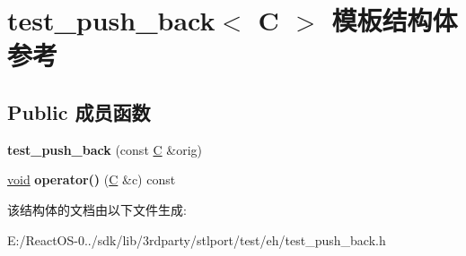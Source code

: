 \hypertarget{structtest__push__back}{}\section{test\+\_\+push\+\_\+back$<$ C $>$ 模板结构体 参考}
\label{structtest__push__back}
\subsection*{Public 成员函数}
\begin{DoxyCompactItemize}
\item 
\mbox{\label{structtest__push__back_a39711cd5eac0f96d58b5043b9ed240f3}} 
{\bfseries test\+\_\+push\+\_\+back} (const \hyperlink{struct_c}{C} \&orig)
\item 
\mbox{\label{structtest__push__back_aff2b751d9ca3d4b2680b38a02f5940f9}} 
\hyperlink{interfacevoid}{void} {\bfseries operator()} (\hyperlink{struct_c}{C} \&c) const
\end{DoxyCompactItemize}


该结构体的文档由以下文件生成\+:\begin{DoxyCompactItemize}
\item 
E\+:/\+React\+O\+S-\/0../sdk/lib/3rdparty/stlport/test/eh/test\+\_\+push\+\_\+back.\+h\end{DoxyCompactItemize}
